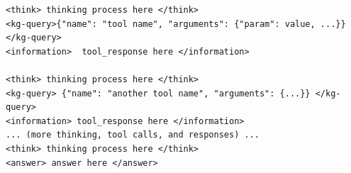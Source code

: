 \begin{table}[t!]
\begin{minipage}{\textwidth}
\begin{mdframed}[style=outerframe]
\begin{mdframed}[style=subframe]
\vspace{6pt}
 
\vspace{3pt}
\begin{lstlisting}[style=inlinecode]
<think> thinking process here </think>
<kg-query>{"name": "tool name", "arguments": {"param": value, ...}}</kg-query>
<information>  tool_response here </information>
 
<think> thinking process here </think>
<kg-query> {"name": "another tool name", "arguments": {...}} </kg-query>
<information> tool_response here </information>
... (more thinking, tool calls, and responses) ...
<think> thinking process here </think>
<answer> answer here </answer>
\end{lstlisting}
 
\vspace{6pt}
 
\vspace{2pt}
\end{mdframed}
\end{mdframed}
\end{minipage}
\end{table}
